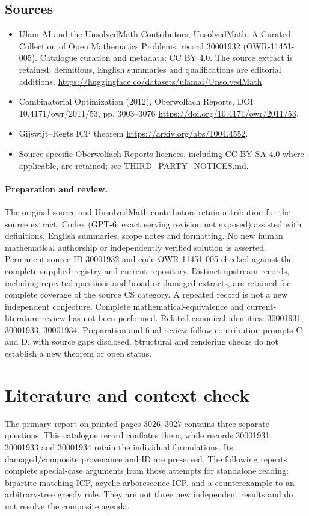 \documentclass[11pt]{article}
\begin{document}
\subsection{Sources}
\begin{itemize}
\item[S1] Ulam AI and the UnsolvedMath Contributors, UnsolvedMath: A Curated Collection of Open Mathematics Problems, record 30001932 (OWR-11451-005). Catalogue curation and metadata: CC BY 4.0. The source extract is retained; definitions, English summaries and qualifications are editorial additions.
\url{https://huggingface.co/datasets/ulamai/UnsolvedMath}.
\item[S2] Combinatorial Optimization (2012), Oberwolfach Reports, DOI 10.4171/owr/2011/53, pp. 3003--3076
\url{https://doi.org/10.4171/owr/2011/53}.
\item[S3] Gijswijt--Regts ICP theorem
\url{https://arxiv.org/abs/1004.4552}.
\item Source-specific Oberwolfach Reports licences, including CC BY-SA 4.0 where applicable, are retained; see THIRD\_PARTY\_NOTICES.md.
\end{itemize}
\paragraph{Preparation and review.}
The original source and UnsolvedMath contributors retain attribution for the source extract. Codex (GPT-6; exact serving revision not exposed) assisted with definitions, English summaries, scope notes and formatting. No new human mathematical authorship or independently verified solution is asserted. Permanent source ID 30001932 and code OWR-11451-005 checked against the complete supplied registry and current repository. Distinct upstream records, including repeated questions and broad or damaged extracts, are retained for complete coverage of the source CS category. A repeated record is not a new independent conjecture. Complete mathematical-equivalence and current-literature review has not been performed. Related canonical identities: 30001931, 30001933, 30001934. Preparation and final review follow contribution prompts C and D, with source gaps disclosed. Structural and rendering checks do not establish a new theorem or open status.
\label{end:30001932}

\section{Literature and context check}
The primary report on printed pages 3026--3027 contains three separate questions. This catalogue record conflates them, while records 30001931, 30001933 and 30001934 retain the individual formulations. Its damaged/composite provenance and ID are preserved. The following repeats complete special-case arguments from those attempts for standalone reading: bipartite matching ICP, acyclic arborescence ICP, and a counterexample to an arbitrary-tree greedy rule. They are not three new independent results and do not resolve the composite agenda.
\end{document}
